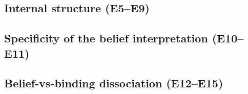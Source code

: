 \subsection{Internal structure (E5--E9)}


\subsection{Specificity of the belief interpretation (E10--E11)}


\subsection{Belief-vs-binding dissociation (E12--E15)}
\label{sec:dissociation}





